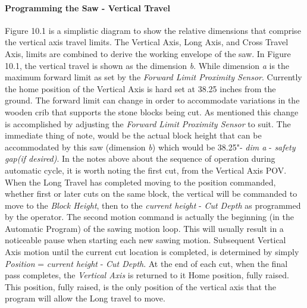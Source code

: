 \paragraph*{Programming the Saw - Vertical Travel}Figure 10.1 is a simplistic diagram to show the relative dimensions that comprise the vertical axis travel limits. The Vertical Axis, Long Axis, and Cross Travel Axis, limits are combined to derive the working envelope of the saw. In Figure 10.1, the vertical travel is shown as the dimension \textit{b}. While dimension \textit{a} is the maximum forward limit as set by the \textit{Forward Limit Proximity Sensor}. Currently the home position of the Vertical Axis is hard set at 38.25 inches from the ground. The forward limit can change in order to accommodate variations in the wooden crib that supports the stone blocks being cut. As mentioned this change is accomplished by adjusting the \textit{Forward Limit Proximity Sensor} to suit. The immediate thing of note, would be the actual block height that can be accommodated by this saw (dimension \textit{b}) which would be 38.25"- \textit{dim a} - \textit{safety gap(if desired)}. In the notes above about the sequence of operation during automatic cycle, it is worth noting the first cut, from the Vertical Axis POV. When the Long Travel has completed moving to the position commanded, whether first or later cuts on the same block, the vertical will be commanded to move to the \textit{Block Height}, then to the \textit{current height} - \textit{Cut Depth} as programmed by the operator. The second motion command is actually the beginning (in the Automatic Program) of the sawing motion loop. This will usually result in a noticeable pause when starting each new sawing motion. Subsequent Vertical Axis motion until the current cut location is completed, is determined by simply \textit{Position} = \textit{current height} - \textit{Cut Depth}. At the end of each cut, when the final pass completes, the \textit{Vertical Axis} is returned to it Home position, fully raised. This position, fully raised, is the only position of the vertical axis that the program will allow the Long travel to move.

